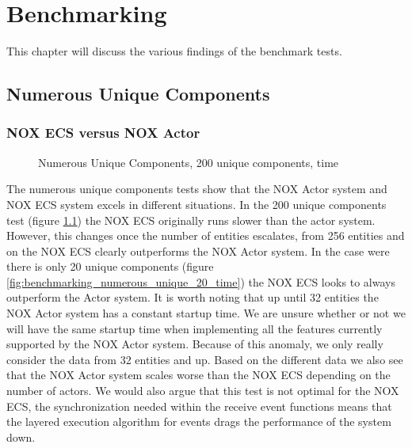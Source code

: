 \chapter{Benchmarking}
\label{chap:benchmarking}
This chapter will discuss the various findings of the benchmark tests.

\section{Numerous Unique Components}
\subsection{NOX ECS versus NOX Actor}
\begin{figure}[H]
\centering
{}
\caption[Benchmark Numerous Components, ECS versus Actor]{Numerous Unique Components, 200 unique components, time}
\label{fig:benchmarking_numerous_unique_200_time}
\end{figure}

The numerous unique components tests show that the NOX Actor system and NOX ECS system excels in different situations.
In the 200 unique components test (figure \ref{fig:benchmarking_numerous_unique_200_time}) the NOX ECS originally runs slower than the actor system.
However, this changes once the number of entities escalates, from 256 entities and on the NOX ECS
clearly outperforms the NOX Actor system.
In the case were there is only 20 unique components (figure \ref{fig:benchmarking_numerous_unique_20_time}) the NOX ECS looks to always outperform the Actor system.
It is worth noting that up until 32 entities the NOX Actor system has a constant startup time.
We are unsure whether or not we will have the same startup time when implementing all the features currently
supported by the NOX Actor system.
Because of this anomaly, we only really consider the data from 32 entities and up.
Based on the different data we also see that the NOX Actor system scales worse than the NOX ECS depending on the number of actors.
We would also argue that this test is not optimal for the NOX ECS, the synchronization needed within the receive event functions
means that the layered execution algorithm for events drags the performance of the system down. 

